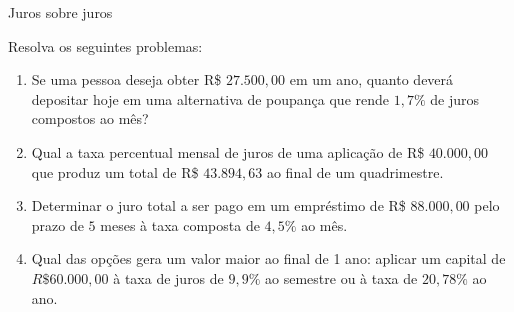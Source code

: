\begin{task}{Juros sobre juros}

Resolva os seguintes problemas:

\begin{enumerate}

\item{}
Se uma pessoa deseja obter R\$ $27.500{,}00$ em um ano, quanto deverá depositar hoje em uma alternativa de poupança que rende $1{,}7\%$ de juros compostos ao mês?

\item{}
Qual a taxa percentual mensal de juros de uma aplicação de R\$ $40.000{,}00$ que produz um total de R\$ $43.894{,}63$ ao final de um quadrimestre.

\item{}
Determinar o juro total a ser pago em um empréstimo de R\$ $88.000{,}00$ pelo prazo de $5$ meses à taxa composta de $4{,}5\%$ ao mês.

\item{}
Qual das opções gera um valor maior ao final de 1 ano: aplicar um capital de $R\$60.000{,}00$ à taxa de juros de $9{,}9\%$ ao semestre ou à taxa de $20{,}78\%$ ao ano.

\end{enumerate}

\end{task}

